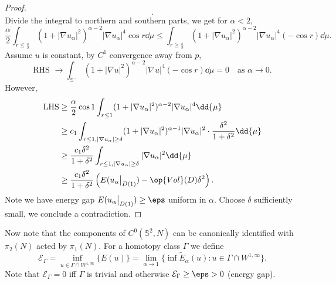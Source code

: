 \documentclass[UTF8,12pt]{article}
\theoremstyle{plain}\newtheorem{theorem}{Theorem}
\theoremstyle{definition}\newtheorem{definition}[theorem]{Definition}
\theoremstyle{definition}\newtheorem{example}[theorem]{Example}
\theoremstyle{plain}\newtheorem{axiom}[theorem]{Axiom}
\theoremstyle{plain}\newtheorem{assertion}[theorem]{Assertion}
\theoremstyle{plain}\newtheorem{corollary}[theorem]{Corollary}
\theoremstyle{plain}\newtheorem{lemma}[theorem]{Lemma}
\theoremstyle{plain}\newtheorem{proposition}[theorem]{Proposition}
\theoremstyle{plain}\newtheorem{prop}[theorem]{Proposition}
\theoremstyle{plain}\newtheorem{conjecture}[theorem]{Conjecture}
\theoremstyle{plain}\newtheorem{conj}[theorem]{Conjecture}
\theoremstyle{plain}\newtheorem{problem}[theorem]{Problem}
\theoremstyle{remark}\newtheorem{notation}[theorem]{Notation}
\theoremstyle{definition}\newtheorem*{question}{Question}
\theoremstyle{definition}\newtheorem*{answer}{Answer}
\theoremstyle{definition}\newtheorem*{goal}{Goal}
\theoremstyle{plain}\newtheorem*{application}{Application}
\theoremstyle{plain}\newtheorem*{exercise}{Exercise}
\theoremstyle{remark}\newtheorem*{remark}{Remark}
\theoremstyle{remark}\newtheorem*{note}{\small{Note}}
\numberwithin{equation}{section}
\numberwithin{theorem}{section}
\numberwithin{figure}{section}
\begin{document}
\begin{proof}
\[    .\] Divide the integral to northern and southern parts, we get for \(\alpha<2\),
    \[
        \frac{\alpha}{2}\int_{r\le \frac{\pi}{2}}(1+|\nabla u_\alpha|^2)^{\alpha-2}
        |\nabla u_\alpha|^4 \cos r\dd{\mu}
        \le \int_{r\ge \frac{\pi}{2}}(1+|\nabla u_\alpha|^2)^{\alpha-2}
        |\nabla u_\alpha|^4(-\cos r)\dd{\mu}
    .\] Assume \(u\) is constant, by \(C^1\) convergence away from \(p\),
    \begin{equation}
        \text{RHS }\to \int_{\mathbb{S}^-}(1+|\nabla u|^2)^{\alpha-2}|\nabla u|^4
        (-\cos r)\dd{\mu}=0\quad\text{as }\alpha\to 0
    .\end{equation}
    However,
    \begin{align*}
        \text{LHS}&\ge \frac{\alpha}{2}\cos 1\int_{r\le 1}
        (1+|\nabla u_\alpha|^2)^{\alpha-2}|\nabla u_\alpha|^4\dd{\mu} \\
        &\ge c_1 \int_{r\le 1,|\nabla u_\alpha|\ge\delta}
        (1+|\nabla u_\alpha|^2)^{\alpha-1}|\nabla u_\alpha|^2\cdot
        \frac{\delta^2}{1+\delta^2}\dd{\mu} \\
        &\ge \frac{c_1\delta^2}{1+\delta^2}\int_{r\le 1,|\nabla u_\alpha|\ge \delta}
        |\nabla u_\alpha|^2\dd{\mu} \\
        &\ge\frac{c_1\delta^2}{1+\delta^2}\left(E(u_\alpha\big|_{D(1)})
        -\op{Vol}(D)\delta^2\right)
    .\end{align*}
    Note we have energy gap \(E(u_\alpha\big|_{D(1)})\ge \eps\) uniform in \(\alpha\).
    Choose \(\delta\) sufficiently small, we conclude a contradiction.
\end{proof}

Now note that the components of \(C^0(\mathbb{S}^2,N)\) can be canonically identified
with \(\pi_2(N)\) acted by \(\pi_1(N)\). For a homotopy class \(\Gamma\) we define \[
    \mathcal{E}_\Gamma=\inf_{u\in \Gamma\cap W^{1,\infty}}\{E(u)\}
    =\lim_{\alpha\to 1}\{\inf \tilde{E}_\alpha(u):u\in \Gamma\cap W^{1,\infty}\}
.\] Note that \(\mathcal{E}_\Gamma=0\) iff \(\Gamma\) is trivial and otherwise
\(\mathcal{E}_\Gamma\ge \eps>0\) (energy gap).
\end{document}
